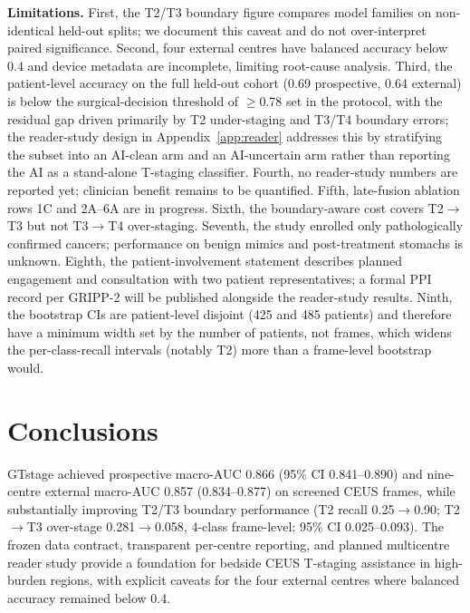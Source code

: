 \documentclass[11pt,a4paper]{article}
\begin{document}
\textbf{Limitations.} First, the T2/T3 boundary figure compares model families on non-identical held-out splits; we document this caveat and do not over-interpret paired significance. Second, four external centres have balanced accuracy below 0.4 and device metadata are incomplete, limiting root-cause analysis. Third, the patient-level accuracy on the full held-out cohort (0.69 prospective, 0.64 external) is below the surgical-decision threshold of $\geq$0.78 set in the protocol, with the residual gap driven primarily by T2 under-staging and T3/T4 boundary errors; the reader-study design in Appendix~\ref{app:reader} addresses this by stratifying the subset into an AI-clean arm and an AI-uncertain arm rather than reporting the AI as a stand-alone T-staging classifier. Fourth, no reader-study numbers are reported yet; clinician benefit remains to be quantified. Fifth, late-fusion ablation rows 1C and 2A--6A are in progress. Sixth, the boundary-aware cost covers T2$\to$T3 but not T3$\to$T4 over-staging. Seventh, the study enrolled only pathologically confirmed cancers; performance on benign mimics and post-treatment stomachs is unknown. Eighth, the patient-involvement statement describes planned engagement and consultation with two patient representatives; a formal PPI record per GRIPP-2 will be published alongside the reader-study results. Ninth, the bootstrap CIs are patient-level disjoint (425 and 485 patients) and therefore have a minimum width set by the number of patients, not frames, which widens the per-class-recall intervals (notably T2) more than a frame-level bootstrap would.

\section{Conclusions}

GTstage achieved prospective macro-AUC 0.866 (95\% CI 0.841--0.890) and nine-centre external macro-AUC 0.857 (0.834--0.877) on screened CEUS frames, while substantially improving T2/T3 boundary performance (T2 recall 0.25$\to$0.90; T2$\to$T3 over-stage 0.281$\to$0.058, 4-class frame-level; 95\% CI 0.025--0.093). The frozen data contract, transparent per-centre reporting, and planned multicentre reader study provide a foundation for bedside CEUS T-staging assistance in high-burden regions, with explicit caveats for the four external centres where balanced accuracy remained below 0.4.

\end{document}
